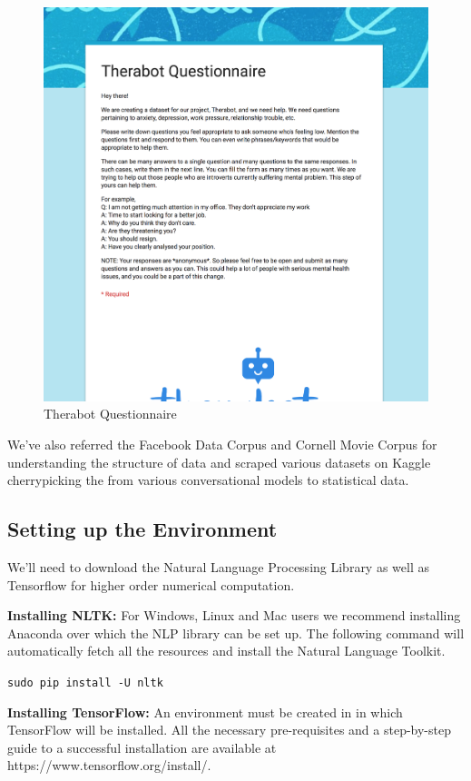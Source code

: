 \begin{figure}[H]
    \centering
    \includegraphics[width=13cm]{images/therabot-questionnaire.png}
    \caption{Therabot Questionnaire}
\end{figure}

We’ve also referred the Facebook Data Corpus and Cornell Movie Corpus for understanding the structure of data and scraped various datasets on Kaggle cherrypicking the from various conversational models to statistical data.

\pagebreak

\subsection{Setting up the Environment}

We’ll need to download the Natural Language Processing Library as well as Tensorflow for higher order numerical computation.

\textbf{Installing NLTK:}
For Windows, Linux and Mac users we recommend installing Anaconda over which the NLP library can be set up. The following command will automatically fetch all the resources and install the Natural Language Toolkit.


\texttt{sudo pip install -U nltk}

\textbf{Installing TensorFlow:}
An environment must be created in in which TensorFlow will be installed. All the necessary pre-requisites and a step-by-step guide to a successful installation are available at https://www.tensorflow.org/install/.

